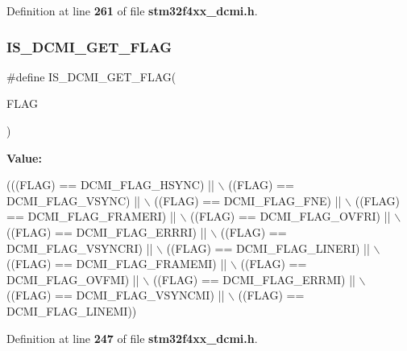 Definition at line \textbf{ 261} of file \textbf{ stm32f4xx\+\_\+dcmi.\+h}.

\mbox{\label{group__DCMI__Flags_gaa0278161a8e39b18ecd4a3501c70e753}} 
\subsubsection{I\+S\+\_\+\+D\+C\+M\+I\+\_\+\+G\+E\+T\+\_\+\+F\+L\+AG}
{\footnotesize\ttfamily \#define I\+S\+\_\+\+D\+C\+M\+I\+\_\+\+G\+E\+T\+\_\+\+F\+L\+AG(\begin{DoxyParamCaption}\item[{}]{F\+L\+AG }\end{DoxyParamCaption})}

{\bfseries Value\+:}
\begin{DoxyCode}
(((FLAG) == DCMI_FLAG_HSYNC) || \(\backslash\)
                                ((FLAG) == DCMI_FLAG_VSYNC) || \(\backslash\)
                                ((FLAG) == DCMI_FLAG_FNE) || \(\backslash\)
                                ((FLAG) == DCMI_FLAG_FRAMERI) || \(\backslash\)
                                ((FLAG) == DCMI_FLAG_OVFRI) || \(\backslash\)
                                ((FLAG) == DCMI_FLAG_ERRRI) || \(\backslash\)
                                ((FLAG) == DCMI_FLAG_VSYNCRI) || \(\backslash\)
                                ((FLAG) == DCMI_FLAG_LINERI) || \(\backslash\)
                                ((FLAG) == DCMI_FLAG_FRAMEMI) || \(\backslash\)
                                ((FLAG) == DCMI_FLAG_OVFMI) || \(\backslash\)
                                ((FLAG) == DCMI_FLAG_ERRMI) || \(\backslash\)
                                ((FLAG) == DCMI_FLAG_VSYNCMI) || \(\backslash\)
                                ((FLAG) == DCMI_FLAG_LINEMI))
\end{DoxyCode}


Definition at line \textbf{ 247} of file \textbf{ stm32f4xx\+\_\+dcmi.\+h}.

